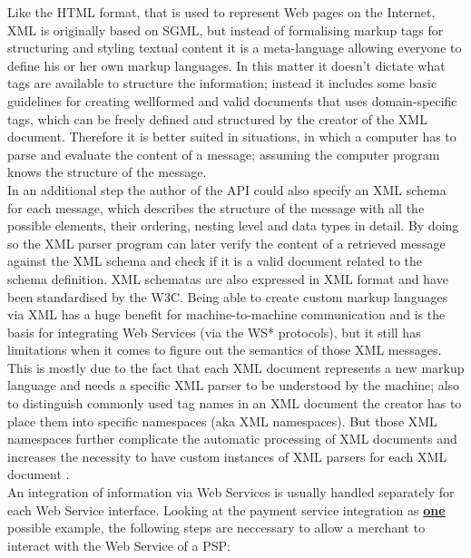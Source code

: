 Like the \gls{HTML} format, that is used to represent Web pages on the Internet, \gls{XML} is originally based on \gls{SGML}, but instead of formalising markup tags for structuring and styling textual content it is a meta-language allowing everyone to define his or her own markup languages. In this matter it doesn’t dictate what tags are available to structure the information; instead it includes some basic guidelines for creating wellformed and valid documents that uses domain-specific tags, which can be freely defined and structured by the creator of the \gls{XML} document. Therefore it is better suited in situations, in which a computer has to parse and evaluate the content of a message; assuming the computer program knows the structure of the message. \\

In an additional step the author of the \gls{API} could also specify an \gls{XML} schema for each message, which describes the structure of the message with all the possible elements, their ordering, nesting level and data types in detail. By doing so the \gls{XML} parser program can later verify the content of a retrieved message against the \gls{XML} schema and check if it is a valid document related to the schema definition. \gls{XML} schematas are also expressed in \gls{XML} format and have been standardised by the \gls{W3C}. Being able to create custom markup languages via \gls{XML} has a huge benefit for machine-to-machine communication and is the basis for integrating Web Services (via the WS* protocols), but it still has limitations when it comes to figure out the semantics of those \gls{XML} messages. This is mostly due to the fact that each \gls{XML} document represents a new markup language and needs a specific \gls{XML} parser to be understood by the machine; also to distinguish commonly used tag names in an \gls{XML} document the creator has to place them into specific namespaces (aka \gls{XML} namespaces). But those \gls{XML} namespaces further complicate the automatic processing of \gls{XML} documents and increases the necessity to have custom instances of \gls{XML} parsers for each \gls{XML} document \citep{taylor2008p2p}. \\

An integration of information via Web Services is usually handled separately for each Web Service interface. Looking at the payment service integration as \textbf{\underline{one}} possible example, the following steps are neccessary to allow a merchant to interact with the Web Service of a \gls{PSP}: \@


